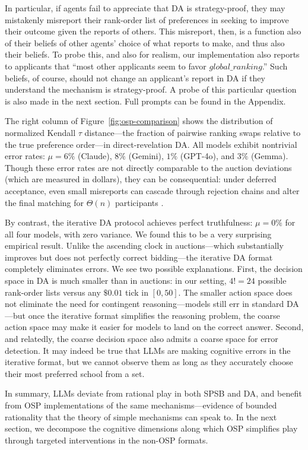 \documentclass[format=acmsmall, review=false]{acmart}
\begin{document}
In particular, if agents fail to appreciate that DA is strategy-proof, they may mistakenly misreport their rank-order list of preferences in seeking to improve their outcome given the reports of others. This misreport, then, is a function also of their beliefs of other agents' choice of what reports to make, and thus also their beliefs. To probe this, and also for realism, our implementation also reports to applicants that ``most other applicants seem to favor ${{global\_ranking}}$.'' Such beliefs, of course, should not change an applicant's report in DA if they understand the mechanism is strategy-proof. A probe of this particular question is also made in the next section. Full prompts can be found in the Appendix.

The right column of Figure~\ref{fig:osp-comparison} shows the distribution of normalized Kendall $\tau$ distance---the fraction of pairwise ranking swaps relative to the true preference order---in direct-revelation DA. All models exhibit nontrivial error rates: $\mu = 6\%$ (Claude), $8\%$ (Gemini), $1\%$ (GPT-4o), and $3\%$ (Gemma). Though these error rates are not directly comparable to the auction deviations (which are measured in dollars), they can be consequential: under deferred acceptance,  even small misreports can cascade through rejection chains and alter the final matching for $\Theta(n)$ participants \citep{dubins1981machiavelli}.

By contrast, the iterative DA protocol achieves perfect truthfulness: $\mu = 0\%$ for all four models, with zero variance. We found this to be a very surprising empirical result. Unlike the ascending clock in auctions---which substantially improves but does not perfectly correct bidding---the iterative DA format completely eliminates errors. We see two possible explanations. First, the decision space in DA is much smaller than in auctions: in our setting, $4! = 24$ possible rank-order lists versus any $\$0.01$ tick in $[0, 50]$. The smaller action space does not eliminate the need for contingent reasoning---models still err in standard DA---but once the iterative format simplifies the reasoning problem, the coarse action space may make it easier for models to land on the correct answer.
Second, and relatedly, the coarse decision space also admits a coarse space for error detection. It may indeed be true that LLMs are making cognitive errors in the iterative format, but we cannot observe them as long as they accurately choose their most preferred school from a set.

In summary, LLMs deviate from rational play in both SPSB and DA, and benefit from OSP implementations of the same mechanisms---evidence of bounded rationality that the theory of simple mechanisms can speak to. In the next section, we decompose the cognitive dimensions along which OSP simplifies play through targeted interventions in the non-OSP formats.
\end{document}
